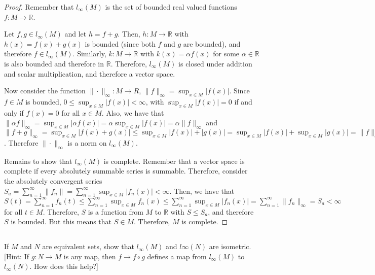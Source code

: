 \begin{proof}
Remember that $l_\infty(M)$ is the set of bounded real valued functions $f: M \rightarrow \mathbb{R}$. 

Let $f,g \in l_\infty(M)$ and let $h=f+g$. Then, $h:M \rightarrow \mathbb{R}$ with $h(x) = f(x) + g(x)$ is bounded (since both $f$ and $g$ are bounded), and therefore $f \in l_\infty(M)$. Similarly, $k:M \rightarrow \mathbb{R}$ with $k(x) =\alpha f(x)$ for some $\alpha \in \mathbb{R}$ is also bounded and therefore in $\mathbb{R}$. Therefore, $l_\infty(M)$ is closed under addition and scalar multiplication, and therefore a vector space.

\vspace{1em}

Now consider the function $\|\cdot\|_\infty: M \rightarrow R$, $\|f\|_\infty = \sup_{x \in M} |f(x)|$. Since $f \in M$ is bounded, $0 \leq \sup_{x \in M} |f(x)| < \infty$, with $\sup_{x \in M} |f(x)| = 0$ if and only if $f(x) = 0$ for all $x \in M$. Also, we have that $\|\alpha f\|_\infty = \sup_{x \in M} |\alpha f(x)| = \alpha \sup_{x \in M} |f(x)| = \alpha \|f\|_\infty$ and $\|f+g\|_\infty = \sup_{x \in M} |f(x)+g(x)| \leq \sup_{x \in M} |f(x)| + |g(x)| = \sup_{x \in M} |f(x)| + \sup_{x \in M} |g(x)| = \|f\|_\infty + \|g\|_\infty$. Therefore $\|\cdot\|_\infty$ is a norm on $l_\infty(M)$.

\vspace{1em}

Remains to show that $l_\infty(M)$ is complete. Remember that a vector space is complete if every absolutely summable series is summable. Therefore, consider the absolutely convergent series $S_a = \sum_{n=1}^\infty \|f_n\| = \sum_{n=1}^\infty \sup_{x \in M} |f_n(x)| < \infty$. Then, we have that $S(t) = \sum_{n=1}^\infty f_n(t) \leq \sum_{n=1}^\infty \sup_{x \in M} f_n(x) \leq \sum_{n=1}^\infty \sup_{x \in M} |f_n(x)| = \sum_{n=1}^\infty \|f_n\|_\infty = S_a < \infty$ for all $t \in M$. Therefore, $S$ is a function from $M$ to $\mathbb{R}$ with $S \leq S_a$, and therefore $S$ is bounded. But this means that $S \in M$. Therefore, $M$ is complete.

\end{proof}

\subsection{} If $M$ and $N$ are equivalent sets, show that $l_\infty(M)$ and $l\infty(N)$ are isometric. [Hint:  If $g : N \rightarrow M$ is any map, then $f \rightarrow f \circ g$ defines a map from $l_\infty(M)$ to $l_\infty(N)$. How does this help?] 

